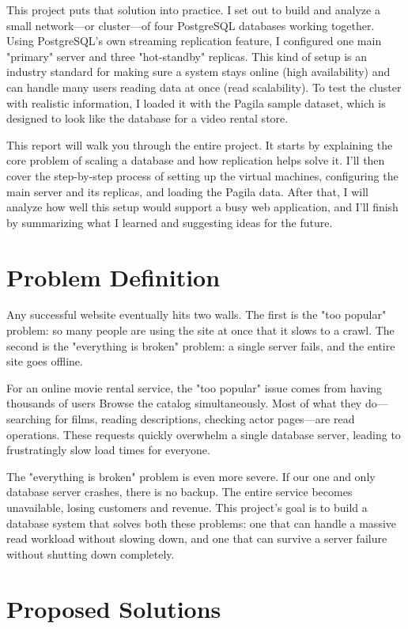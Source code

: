 \documentclass[conference]{IEEEtran}
\begin{document}
This project puts that solution into practice. I set out to build and analyze a small network—or cluster—of four PostgreSQL databases working together. Using PostgreSQL's own streaming replication feature, I configured one main "primary" server and three "hot-standby" replicas. This kind of setup is an industry standard for making sure a system stays online (high availability) and can handle many users reading data at once (read scalability). To test the cluster with realistic information, I loaded it with the Pagila sample dataset, which is designed to look like the database for a video rental store.

This report will walk you through the entire project. It starts by explaining the core problem of scaling a database and how replication helps solve it. I'll then cover the step-by-step process of setting up the virtual machines, configuring the main server and its replicas, and loading the Pagila data. After that, I will analyze how well this setup would support a busy web application, and I'll finish by summarizing what I learned and suggesting ideas for the future.
\section{Problem Definition}
Any successful website eventually hits two walls. The first is the "too popular" problem: so many people are using the site at once that it slows to a crawl. The second is the "everything is broken" problem: a single server fails, and the entire site goes offline.

For an online movie rental service, the "too popular" issue comes from having thousands of users Browse the catalog simultaneously. Most of what they do—searching for films, reading descriptions, checking actor pages—are read operations. These requests quickly overwhelm a single database server, leading to frustratingly slow load times for everyone.

The "everything is broken" problem is even more severe. If our one and only database server crashes, there is no backup. The entire service becomes unavailable, losing customers and revenue. This project's goal is to build a database system that solves both these problems: one that can handle a massive read workload without slowing down, and one that can survive a server failure without shutting down completely.

\section{Proposed Solutions}
\end{document}
